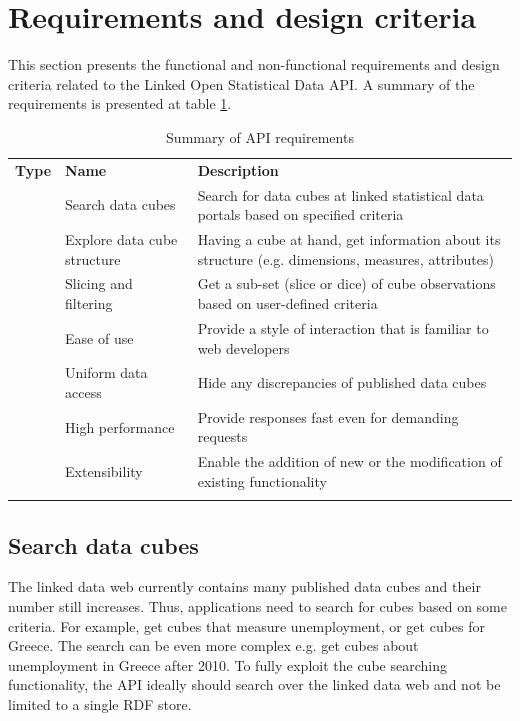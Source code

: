 \documentclass{llncs}
\begin{document}
\section{Requirements and design criteria}\label{sec:reqs}

This section presents the functional and non-functional requirements and design criteria related to the Linked Open Statistical Data API.
A summary of the requirements is presented at table \ref{tbl:req}.

\begin{table}
\caption{Summary of API requirements}
\begin{tabular}{p{2cm}p{4cm}p{5.9cm}}
\hline\noalign{\smallskip}
\textbf{Type} & \textbf{Name} & \textbf{Description}\\
\noalign{\smallskip}
\hline
\noalign{\smallskip}
\multirow{3}{*}{functional} & Search data cubes & Search for data cubes at linked statistical data portals based on specified criteria\\\noalign{\smallskip}
 & Explore data cube structure & Having a cube at hand, get information about its structure (e.g. dimensions, measures, attributes)\\\noalign{\smallskip}
 & Slicing and filtering & Get a sub-set (slice or dice) of cube observations based on user-defined criteria\\\noalign{\smallskip}\hline
\multirow{4}{*}{non-functional} & Ease of use & Provide a style of interaction that is familiar to web developers\\\noalign{\smallskip}
 & Uniform data access & Hide any discrepancies of published data cubes\\\noalign{\smallskip}
 & High performance & Provide responses fast even for demanding requests\\\noalign{\smallskip}
 & Extensibility & Enable the addition of new or the modification of existing functionality\\\noalign{\smallskip}
\hline
\end{tabular}
\label{tbl:req}
\end{table}

\subsection{Search data cubes}\label{sec:search}

The linked data web currently contains many published data cubes and their number still increases. Thus, applications need to search for cubes based on some criteria. For example, get cubes that measure unemployment, or get cubes for Greece. The search can be even more complex e.g. get cubes about unemployment in Greece after 2010. To fully exploit the cube searching functionality, the API ideally should search over the linked data web and not be limited to a single RDF store.
\end{document}
